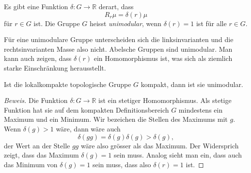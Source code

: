 \begin{definition}
Es gibt eine Funktion $\delta\colon G\to \mathbb{R}$ derart, dass
\[
R_r \mu = \delta(r) \mu
\]
für $r\in G$
ist.
Die Gruppe $G$ heisst {\em unimodular}, wenn $\delta(r)=1$ ist für
alle $r\in G$.
\end{definition}

Für eine unimodulare Gruppe unterscheiden sich die linksinvarianten
und die rechtsinvarianten Masse also nicht.
Abelsche Gruppen sind unimodular.
Man kann auch zeigen, dass $\delta(r)$ ein Homomorphismus ist,
was sich als ziemlich starke Einschränkung herausstellt.

\begin{satz}
Ist die lokalkompakte topologische Gruppe $G$ kompakt, dann ist
sie unimodular.
\end{satz}

\begin{proof}[Beweis]
Die Funktion $\delta\colon G\to\mathbb{R}$ ist ein stetiger Homomorphismus.
Als stetige Funktion hat sie auf dem kompakten Definitionsbereich $G$
mindestens ein Maximum und ein Minimum.
Wir bezeichen die Stellen des Maximums mit $g$.
Wenn $\delta(g)>1$ wäre, dann wäre auch
\[
\delta(gg)
=
\delta(g)
\delta(g)
>
\delta(g),
\]
der Wert an  der Stelle $gg$ wäre also grösser als das Maximum.
Der Widersprich zeigt, dass das Maximum $\delta(g)=1$ sein muss.
Analog sieht man ein, dass auch das Minimum von $\delta(g)=1$
sein muss, dass also $\delta(r)=1$ ist.
\end{proof}

